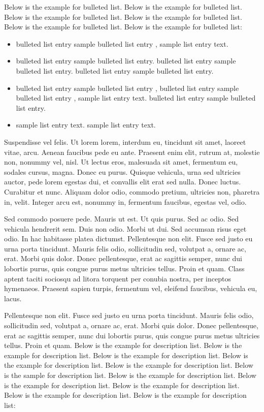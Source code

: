 \documentclass[ASNA,twocolumn]{USG} %
\begin{document}
Below is the example \cite{Caramana1998,Mavriplis2003,Hoch2009} for bulleted list. Below is the example for bulleted list. Below is the example for bulleted list. Below is the example for bulleted list. Below is the example for bulleted list. Below is the example for bulleted list:
\begin{itemize}
\item bulleted list entry sample bulleted list entry \cite{Scovazzi2008}, sample list entry text.
\item bulleted list entry sample bulleted list entry. bulleted list entry sample bulleted list entry. bulleted list entry sample bulleted list entry.
\item bulleted list entry sample bulleted list entry \cite{Shashkov1996}, bulleted list entry sample bulleted list entry \cite{Knupp1999}, sample list entry text.  bulleted list entry sample bulleted list entry.
\item sample list entry text. sample list entry text.
\end{itemize}

Suspendisse vel felis. Ut lorem lorem, interdum eu, tincidunt sit amet, laoreet vitae, arcu. Aenean faucibus pede eu
ante. Praesent enim elit, rutrum at, molestie non, nonummy vel, nisl. Ut lectus eros, malesuada sit amet, fermentum
eu, sodales cursus, magna. Donec eu purus. Quisque vehicula, urna sed ultricies auctor, pede lorem egestas dui, et
convallis elit erat sed nulla. Donec luctus. Curabitur et nunc. Aliquam dolor odio, commodo pretium, ultricies non,
pharetra in, velit. Integer arcu est, nonummy in, fermentum faucibus, egestas vel, odio.

Sed commodo posuere pede. Mauris ut est. Ut quis purus. Sed ac odio. Sed vehicula hendrerit sem. Duis non
odio. Morbi ut dui. Sed accumsan risus eget odio. In hac habitasse platea dictumst. Pellentesque non elit. Fusce
sed justo eu urna porta tincidunt. Mauris felis odio, sollicitudin sed, volutpat a, ornare ac, erat. Morbi quis dolor. Donec pellentesque, erat ac sagittis semper, nunc dui lobortis purus, quis congue purus metus ultricies tellus. Proin
et quam. Class aptent taciti sociosqu ad litora torquent per conubia nostra, per inceptos hymenaeos. Praesent sapien
turpis, fermentum vel, eleifend faucibus, vehicula eu, lacus.

Pellentesque non elit. Fusce
sed justo eu urna porta tincidunt. Mauris felis odio, sollicitudin sed, volutpat a, ornare ac, erat. Morbi quis dolor. Donec pellentesque, erat ac sagittis semper, nunc dui lobortis purus, quis congue purus metus ultricies tellus. Proin
et quam. Below is the example for description list. Below is the example for description list. Below is the example for description list. Below is the example for description list. Below is the example for description list. Below is the sample for description list. Below is the example for description list. Below is the example for description list. Below is the example for description list. Below is the example for description list. Below is the example for description list:\medskip
\end{document}
